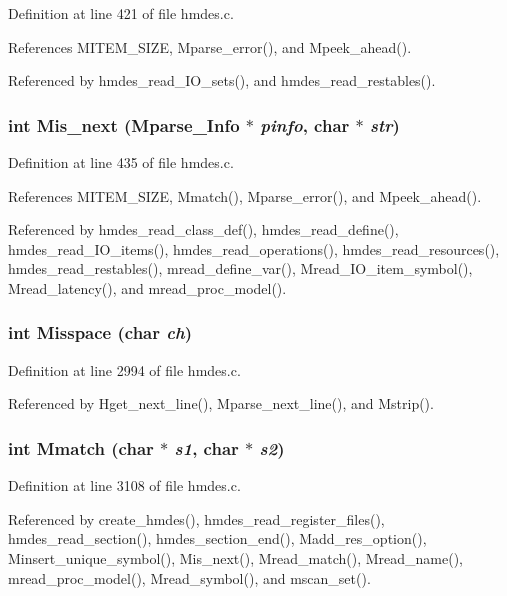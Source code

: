 Definition at line 421 of file hmdes.c.

References MITEM\_\-SIZE, Mparse\_\-error(), and Mpeek\_\-ahead().

Referenced by hmdes\_\-read\_\-IO\_\-sets(), and hmdes\_\-read\_\-restables().
\subsubsection{\setlength{\rightskip}{0pt plus 5cm}int Mis\_\-next (\bf{Mparse\_\-Info} $\ast$ {\em pinfo}, char $\ast$ {\em str})}\label{hmdes_8h_8233d14a6a48cff6d2bd467a11583d87}




Definition at line 435 of file hmdes.c.

References MITEM\_\-SIZE, Mmatch(), Mparse\_\-error(), and Mpeek\_\-ahead().

Referenced by hmdes\_\-read\_\-class\_\-def(), hmdes\_\-read\_\-define(), hmdes\_\-read\_\-IO\_\-items(), hmdes\_\-read\_\-operations(), hmdes\_\-read\_\-resources(), hmdes\_\-read\_\-restables(), mread\_\-define\_\-var(), Mread\_\-IO\_\-item\_\-symbol(), Mread\_\-latency(), and mread\_\-proc\_\-model().
\subsubsection{\setlength{\rightskip}{0pt plus 5cm}int Misspace (char {\em ch})}\label{hmdes_8h_7812dadb15947686c187df7d3d07ffbc}




Definition at line 2994 of file hmdes.c.

Referenced by Hget\_\-next\_\-line(), Mparse\_\-next\_\-line(), and Mstrip().
\subsubsection{\setlength{\rightskip}{0pt plus 5cm}int Mmatch (char $\ast$ {\em s1}, char $\ast$ {\em s2})}\label{hmdes_8h_d168399f07589e6ab6fad5c3ca7c6336}




Definition at line 3108 of file hmdes.c.

Referenced by create\_\-hmdes(), hmdes\_\-read\_\-register\_\-files(), hmdes\_\-read\_\-section(), hmdes\_\-section\_\-end(), Madd\_\-res\_\-option(), Minsert\_\-unique\_\-symbol(), Mis\_\-next(), Mread\_\-match(), Mread\_\-name(), mread\_\-proc\_\-model(), Mread\_\-symbol(), and mscan\_\-set().
